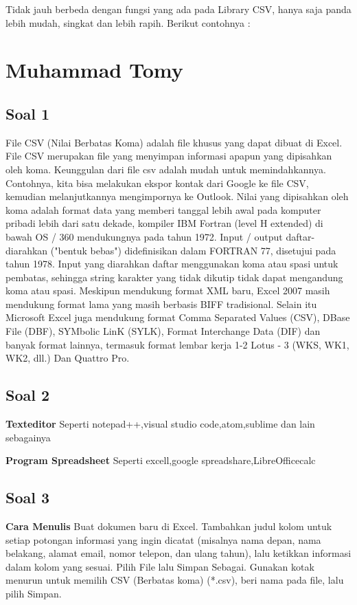 Tidak jauh berbeda dengan fungsi yang ada pada Library CSV, hanya saja panda lebih mudah, singkat dan lebih rapih. Berikut contohnya :



\section{Muhammad Tomy}
\subsection{Soal 1}
File CSV (Nilai Berbatas Koma) adalah file khusus yang dapat dibuat di Excel. File CSV merupakan file yang menyimpan informasi apapun yang dipisahkan oleh koma. Keunggulan dari file csv adalah mudah untuk memindahkannya. Contohnya, kita bisa melakukan ekspor kontak dari Google ke file CSV, kemudian melanjutkannya mengimpornya ke Outlook.
Nilai yang dipisahkan oleh koma adalah format data yang memberi tanggal lebih awal pada komputer pribadi lebih dari satu dekade, kompiler IBM Fortran (level H extended) di bawah OS / 360 mendukungnya pada tahun 1972. Input / output daftar-diarahkan ("bentuk bebas") didefinisikan dalam FORTRAN 77, disetujui pada tahun 1978. Input yang diarahkan daftar menggunakan koma atau spasi untuk pembatas, sehingga string karakter yang tidak dikutip tidak dapat mengandung koma atau spasi.
Meskipun mendukung format XML baru, Excel 2007 masih mendukung format lama yang masih berbasis BIFF tradisional. Selain itu Microsoft Excel juga mendukung format Comma Separated Values (CSV), DBase File (DBF), SYMbolic LinK (SYLK), Format Interchange Data (DIF) dan banyak format lainnya, termasuk format lembar kerja 1-2 Lotus - 3 (WKS, WK1, WK2, dll.) Dan Quattro Pro.

\subsection{Soal 2}
\textbf{Texteditor}
Seperti notepad++,visual studio code,atom,sublime dan lain sebagainya

\textbf{Program Spreadsheet}
Seperti excell,google spreadshare,LibreOfficecalc

\subsection{Soal 3}
\textbf{Cara Menulis}
Buat dokumen baru di Excel. Tambahkan judul kolom untuk setiap potongan informasi yang ingin dicatat (misalnya nama depan, nama belakang, alamat email, nomor telepon, dan ulang tahun), lalu ketikkan informasi dalam kolom yang sesuai. Pilih File lalu Simpan Sebagai. Gunakan kotak menurun untuk memilih CSV (Berbatas koma) (*.csv), beri nama pada file, lalu pilih Simpan.

